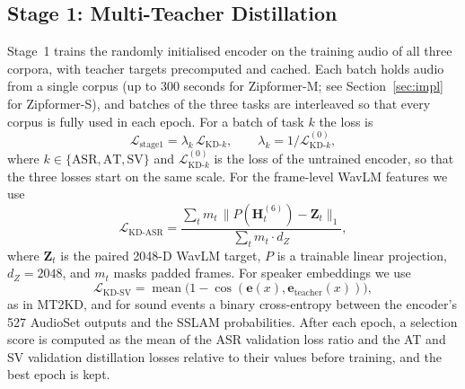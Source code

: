 \documentclass[lettersize,journal]{IEEEtran}
\begin{document}
\subsection{Stage 1: Multi-Teacher Distillation}
Stage~1 trains the randomly initialised encoder on the training audio of all three corpora, with teacher targets
precomputed and cached. Each batch holds audio from a single corpus (up to 300 seconds for Zipformer-M; see
Section~\ref{sec:impl} for Zipformer-S), and batches of the three tasks are interleaved so that every corpus is
fully used in each epoch. For a batch of task $k$ the loss is
\begin{equation}
  \mathcal{L}_{\text{stage1}} = \lambda_k\,\mathcal{L}_{\text{KD-}k}, \qquad
  \lambda_k = 1 / \mathcal{L}^{(0)}_{\text{KD-}k},
  \label{eq:stage1}
\end{equation}
where $k\in\{\text{ASR},\text{AT},\text{SV}\}$ and $\mathcal{L}^{(0)}_{\text{KD-}k}$ is the loss of the untrained
encoder, so that the three losses start on the same scale. For the frame-level WavLM features we use
\begin{equation}
  \mathcal{L}_{\text{KD-ASR}} = \frac{\sum_t m_t \,\big\| P(\mathbf{H}^{(6)}_{t}) - \mathbf{Z}_{t} \big\|_1}
  {\sum_t m_t \cdot d_Z},
  \label{eq:feat}
\end{equation}
where $\mathbf{Z}_t$ is the paired 2048-D WavLM target, $P$ is a trainable linear projection, $d_Z=2048$, and $m_t$
masks padded frames. For speaker embeddings we use
\begin{equation}
  \mathcal{L}_{\text{KD-SV}} = \operatorname{mean}\!\big(1 - \cos(\mathbf{e}(x), \mathbf{e}_{\text{teacher}}(x))\big),
  \label{eq:sv}
\end{equation}
as in MT2KD, and for sound events a binary cross-entropy between the encoder's 527 AudioSet outputs and the SSLAM
probabilities. After each epoch, a selection score is computed as the mean of the ASR validation loss ratio and the
AT and SV validation distillation losses relative to their values before training, and the best epoch is kept.
\end{document}
